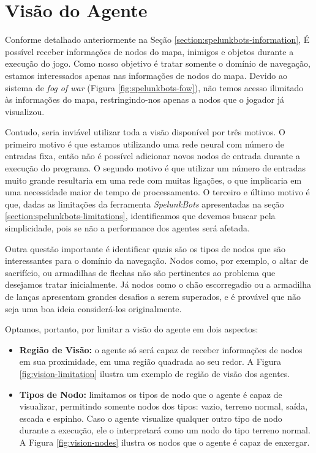 \section{\label{section:modelling-vision}Visão do Agente}
Conforme detalhado anteriormente na Seção \ref{section:spelunkbots-information},
É possível receber informações de nodos do mapa, inimigos e objetos durante a
execução do jogo. Como nosso objetivo é tratar somente o domínio de navegação,
estamos interessados apenas nas informações de nodos do mapa. Devido ao sistema
de \textit{fog of war} (Figura \ref{fig:spelunkbots-fow}), não temos acesso
ilimitado às informações do mapa, restringindo-nos apenas a nodos que o jogador
já visualizou.

Contudo, seria inviável utilizar toda a visão disponível por três motivos. O
primeiro motivo é que estamos utilizando uma rede neural com número de entradas
fixa, então não é possível adicionar novos nodos de entrada durante a execução
do programa. O segundo motivo é que utilizar um número de entradas muito grande
resultaria em uma rede com muitas ligações, o que implicaria em uma necessidade
maior de tempo de processamento. O terceiro e último motivo é que, dadas as
limitações da ferramenta \textit{SpelunkBots} apresentadas na seção
\ref{section:spelunkbots-limitations}, identificamos que devemos buscar pela
simplicidade, pois se não a performance dos agentes será afetada.

Outra questão importante é identificar quais são os tipos de nodos que são
interessantes para o domínio da navegação. Nodos como, por exemplo, o altar de
sacrifício, ou armadilhas de flechas não são pertinentes ao problema que
desejamos tratar inicialmente. Já nodos como o chão escorregadio ou a armadilha
de lanças apresentam grandes desafios a serem superados, e é provável que não
seja uma boa ideia considerá-los originalmente.

Optamos, portanto, por limitar a visão do agente em dois aspectos:

\begin{itemize}
	\item \textbf{Região de Visão:} o agente só será capaz de receber
		informações de nodos em sua proximidade, em uma região quadrada ao seu
		redor. A Figura \ref{fig:vision-limitation} ilustra um exemplo de região
		de visão dos agentes.

	\item \textbf{Tipos de Nodo:} limitamos os tipos de nodo que o agente é
		capaz de visualizar, permitindo somente nodos dos tipos: vazio, terreno
		normal, saída, escada e espinho. Caso o agente visualize qualquer outro
		tipo de nodo durante a execução, ele o interpretará como um nodo do tipo
		terreno normal. A Figura \ref{fig:vision-nodes} ilustra os nodos que o
		agente é capaz de enxergar.
\end{itemize}

